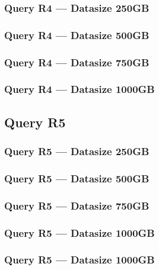 \subsubsection{Query R4 --- Datasize 250GB}



\newpage
\subsubsection{Query R4 --- Datasize 500GB}



\newpage
\subsubsection{Query R4 --- Datasize 750GB}



\newpage
\subsubsection{Query R4 --- Datasize 1000GB}



\newpage
\subsection{Query R5}
\subsubsection{Query R5 --- Datasize 250GB}



\newpage
\subsubsection{Query R5 --- Datasize 500GB}



\newpage
\subsubsection{Query R5 --- Datasize 750GB}



\newpage
\subsubsection{Query R5 --- Datasize 1000GB}
\subsubsection{Query R5 --- Datasize 1000GB}



\newpage
